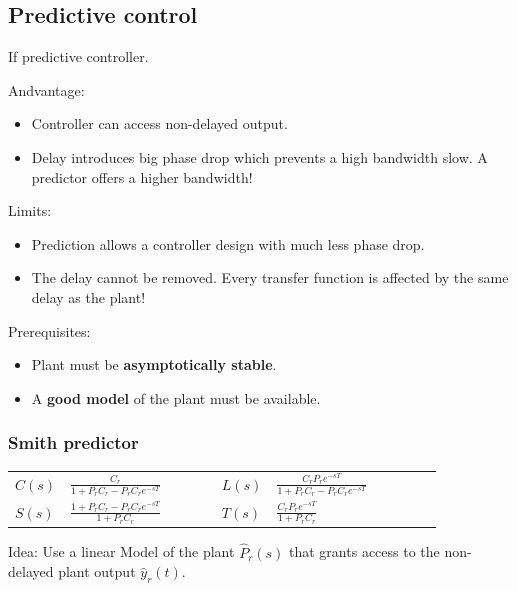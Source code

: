 \documentclass[10pt,a4paper]{scrartcl}
\begin{document}
\begin{multicols*}{3}
	
	
	\section{Predictive control}
	
	If  \dahe predictive controller.
	
	
	Andvantage: 
	\begin{itemize}	
	\compaq
	\item
	Controller can access non-delayed output.
	\item
	Delay introduces big phase drop which prevents a high bandwidth \dahe slow. A predictor offers a higher bandwidth!
	\end{itemize}
	
	Limits:
	\begin{itemize}
	\compaq
	\item
	Prediction allows a controller design with much less phase drop.
	\item
	The delay cannot be removed. Every transfer function is affected by the same delay as the plant!
	\end{itemize}
	
	Prerequisites:
	\begin{itemize}
	\compaq
	\item
	Plant must be \textbf{asymptotically stable}.
	\item
	A \textbf{good model} of the plant must be available.
	\end{itemize}
	
	\subsubsection{Smith predictor}
	
	
	
	\columnbreak
	
	\begin{tabular}{l@{ = }p{0.4\linewidth}l@{ = }p{0.45\linewidth}}
	$C(s)$&$\frac{C_r}{1+P_rC_r-P_rC_re^{-sT}}$&$L(s)$&$\frac{C_rP_re^{-sT}}{1+P_rC_r-P_rC_re^{-sT}}$\\
	$S(s)$&$\frac{1+P_rC_r-P_rC_re^{-sT}}{1+P_rC_r}$&$T(s)$&$\frac{C_rP_re^{-sT}}{1+P_rC_r}$
	\end{tabular}
	
	Idea: Use a linear Model of the plant $\hat{P}_r(s)$ that grants access to the non-delayed plant output $\hat{y}_r(t)$.
	

\end{multicols*}
\end{document}
